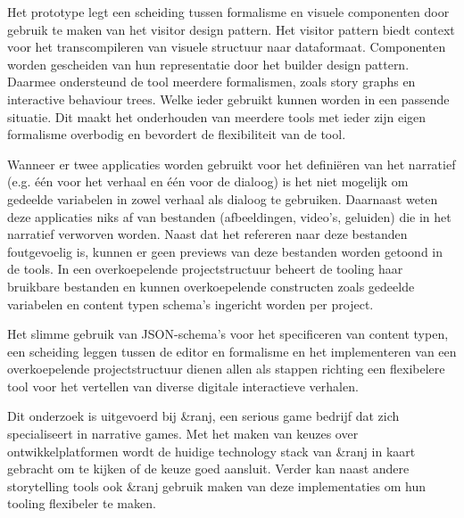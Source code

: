Het prototype legt een scheiding tussen formalisme en visuele componenten door gebruik te maken van het visitor design pattern. Het visitor pattern biedt context voor het transcompileren van visuele structuur naar dataformaat. Componenten worden gescheiden van hun representatie door het builder design pattern. Daarmee ondersteund de tool meerdere formalismen, zoals story graphs en interactive behaviour trees. Welke ieder gebruikt kunnen worden in een passende situatie. Dit maakt het onderhouden van meerdere tools met ieder zijn eigen formalisme overbodig en bevordert de flexibiliteit van de tool.

Wanneer er twee applicaties worden gebruikt voor het definiëren van het narratief (e.g. één voor het verhaal en één voor de dialoog) is het niet mogelijk om gedeelde variabelen in zowel verhaal als dialoog te gebruiken. Daarnaast weten deze applicaties niks af van bestanden (afbeeldingen, video's, geluiden) die in het narratief verworven worden. Naast dat het refereren naar deze bestanden foutgevoelig is, kunnen er geen previews van deze bestanden worden getoond in de tools. In een overkoepelende projectstructuur beheert de tooling haar bruikbare bestanden en kunnen overkoepelende constructen zoals gedeelde variabelen en content typen schema's ingericht worden per project.


Het slimme gebruik van JSON-schema’s voor het specificeren van content typen, een scheiding leggen tussen de editor en formalisme en het implementeren van een overkoepelende projectstructuur dienen allen als stappen richting een flexibelere tool voor het vertellen van diverse digitale interactieve verhalen.

Dit onderzoek is uitgevoerd bij \&ranj, een serious game bedrijf dat zich specialiseert in narrative games. Met het maken van keuzes over ontwikkelplatformen wordt de huidige technology stack van \&ranj in kaart gebracht om te kijken of de keuze goed aansluit. Verder kan naast andere storytelling tools ook \&ranj gebruik maken van deze implementaties om hun tooling flexibeler te maken.